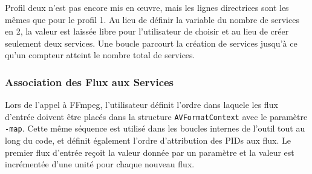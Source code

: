 \documentclass[12pt,a4paper]{article}
\begin{document}
Profil deux n'est pas encore mis en œuvre, mais les lignes directrices sont les mêmes que pour le profil 1. Au lieu de définir la variable du nombre de services en 2, la valeur est laissée libre pour l'utilisateur de choisir et au lieu de créer seulement deux services. Une boucle parcourt la création de services jusqu'à ce qu'un compteur atteint le nombre total de services.

\subsubsection{Association des Flux aux Services}
\label{stream_mapping}


Lors de l'appel à FFmpeg, l'utilisateur définit l'ordre dans laquele les flux d'entrée doivent être placés dans la structure \texttt{AVFormatContext} avec le paramètre \texttt{-map}. Cette même séquence est utilisé dans les boucles internes de l'outil tout au long du code, et définit également l'ordre d'attribution des PIDs aux flux. Le premier flux d'entrée reçoit la valeur donnée par un paramètre et la valeur est incrémentée d'une unité pour chaque nouveau flux.
\end{document}
